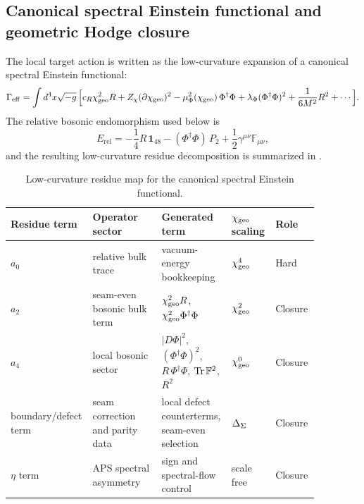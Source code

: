 \subsection{Canonical spectral Einstein functional and geometric Hodge closure}

The local target action is written as the low-curvature expansion of a canonical spectral
Einstein functional:
\begin{equation}
\label{eq:chi-effective-action}
\begin{aligned}
\Gamma_{\mathrm{eff}}
=
\int d^4x\sqrt{-g}\,
\Big[
c_R\chi_{\mathrm{geo}}^2R
+Z_\chi(\partial\chi_{\mathrm{geo}})^2
-\mu_\Phi^2(\chi_{\mathrm{geo}})\,\Phi^\dagger\Phi
+\lambda_\Phi(\Phi^\dagger\Phi)^2
+\frac{1}{6M^2}R^2
+\cdots
\Big].
\end{aligned}
\end{equation}
The relative bosonic endomorphism used below is
\begin{equation}
\label{eq:relative-bosonic-endomorphism}
E_{\mathrm{rel}}
=
-\frac14 R\,\mathbf 1_{48}
-
(\Phi^\dagger\Phi)\,P_2
+
\frac12\gamma^{\mu\nu}\mathbb F_{\mu\nu},
\end{equation}
and the resulting low-curvature residue decomposition is summarized in
.

\begin{table}[t]
\centering
\scriptsize
\setlength{\tabcolsep}{3pt}
\begin{tabular}{@{}>{\raggedright\arraybackslash}p{0.15\linewidth}>{\raggedright\arraybackslash}p{0.22\linewidth}>{\raggedright\arraybackslash}p{0.22\linewidth}>{\raggedright\arraybackslash}p{0.14\linewidth}>{\raggedright\arraybackslash}p{0.14\linewidth}@{}}
\toprule
Residue term & Operator sector & Generated term & $\chi_{\mathrm{geo}}$ scaling & Role \\
\midrule
$a_0$ & relative bulk trace & vacuum-energy bookkeeping & $\chi_{\mathrm{geo}}^4$ & Hard \\
$a_2$ & seam-even bosonic bulk term & $\chi_{\mathrm{geo}}^2R$, $\chi_{\mathrm{geo}}^2\Phi^\dagger\Phi$ & $\chi_{\mathrm{geo}}^2$ & Closure \\
$a_4$ & local bosonic sector & $|D\Phi|^2$, $(\Phi^\dagger\Phi)^2$, $R\,\Phi^\dagger\Phi$, $\operatorname{Tr}\mathbb F^2$, $R^2$ & $\chi_{\mathrm{geo}}^0$ & Closure \\
boundary/defect term & seam correction and parity data & local defect counterterms, seam-even selection & $\Delta_{\Sigma}$ & Closure \\
$\eta$ term & APS spectral asymmetry & sign and spectral-flow control & scale free & Closure \\
\bottomrule
\end{tabular}
\caption{Low-curvature residue map for the canonical spectral Einstein functional.}
\label{tab:heat-kernel-map}
\end{table}

